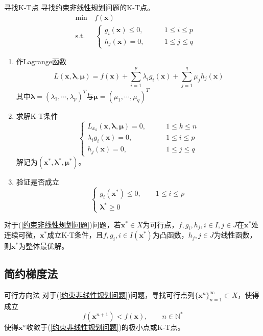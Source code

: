 \documentclass[lang = cn, scheme = chinese, thmcnt = section]{elegantbook}
\newcommand{\N}{\mathbb{N}}            %
\newcommand{\sub}{\subset}             %
\newcommand{\bs}{\boldsymbol}          %
\begin{document}
\begin{theorem}{寻找K-T点}
	寻找约束非线性规划问题的K-T点。
	\begin{align*}
		& \text{min}  \quad f(\bs{x})\\
		& \text{s.t.} \;\, \quad \begin{cases}
			g_i(\bs{x})\le 0,\qquad & 1\le i \le p\\
			h_j(\bs{x})=0,\qquad & 1\le j \le q
		\end{cases}
	\end{align*}
	\begin{enumerate}
		\item 作Lagrange函数
		$$
		L(\bs{x},\bs{\lambda},\bs{\mu})=f(\bs{x})+\sum_{i=1}^{p}\lambda_i g_i(\bs{x})+\sum_{j=1}^{q}\mu_j h_j(\bs{x})
		$$
		其中$\bs{\lambda}=(\lambda_1,\cdots,\lambda_p)^T$与$\bs{\mu}=(\mu_1,\cdots,\mu_q)^T$
		\item 求解K-T条件
		$$
		\begin{cases}
			L_{x_k}(\bs{x},\bs{\lambda},\bs{\mu})=0,\qquad & 1\le k \le n\\
			\lambda_ig_i(\bs{x})=0,\qquad & 1\le i \le p\\
			h_j(\bs{x})=0,\qquad & 1\le j \le q
		\end{cases}
		$$
		解记为$(\bs{x}^*,\bs{\lambda}^*,\bs{\mu}^*)$。
		\item 验证是否成立
		$$
		\begin{cases}
			g_i(\bs{x}^*)\le 0,\qquad 1\le i \le p\\
			\bs{\lambda}^*\ge {0}
		\end{cases}
		$$
	\end{enumerate}
\end{theorem}

\begin{theorem}
	对于(\ref{约束非线性规划问题})问题，若$\bs{x}^*\in X$为可行点，$f,g_i,h_j,i\in I,j\in J$在$\bs{x}^*$处连续可微，$\bs{x}^*$成立K-T条件，且$f,g_i,i\in I(\bs{x}^*)$为凸函数，$h_j,j\in J$为线性函数，则$\bs{x}^*$为整体最优解。
\end{theorem}

\subsection{简约梯度法}

\begin{definition}{可行方向法}
	对于(\ref{约束非线性规划问题})问题，寻找可行点列$\{\bs{x}^n\}_{n=1}^{\infty}\sub X$，使得成立
	$$
	f(\bs{x}^{n+1})<f(\bs{x}),\qquad n\in\N^*
	$$
	使得$\bs{x}^n$收敛于(\ref{约束非线性规划问题})的极小点或K-T点。
\end{definition}
\end{document}
